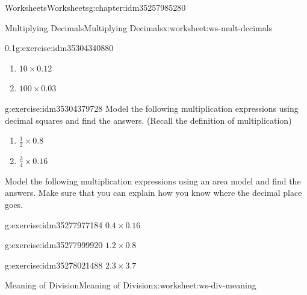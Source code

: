 \documentclass[twoside,11pt,]{book}
\begin{document}
\begin{chapterptx}{Worksheets}{}{Worksheets}{}{}{g:chapter:idm35257985280}
\begin{worksheet-section-numberless}{Multiplying Decimals}{}{Multiplying Decimals}{}{}{x:worksheet:ws-mult-decimals}
\begin{divisionexercise}{3}{}{0.1}{g:exercise:idm35304340880}
\begin{enumerate}[label=(\alph*)]
\item{}\(10 \times 0.12 \)%
\item{}\(100 \times 0.03 \)%
\end{enumerate}
\end{divisionexercise}%
\begin{divisionexercise}{4}{}{}{g:exercise:idm35304379728}%
Model the following multiplication expressions using decimal squares and find the answers. (Recall the definition of multiplication)%
%
\begin{enumerate}[label=(\alph*)]
\item{}\(\frac{1}{2} \times 0.8 \)%
\item{}\(\frac{3}{4} \times 0.16 \)%
\end{enumerate}
\end{divisionexercise}%
\clearpage
\begin{introduction}{}%
Model the following multiplication expressions using an area model and find the answers.  Make sure that you can explain how you know where the decimal place goes.%
\end{introduction}%
\begin{divisionexercise}{5}{}{}{g:exercise:idm35277977184}%
\(0.4 \times 0.16\)%
\end{divisionexercise}%
\begin{divisionexercise}{6}{}{}{g:exercise:idm35277999920}%
\(1.2 \times 0.8\)%
\end{divisionexercise}%
\begin{divisionexercise}{7}{}{}{g:exercise:idm35278021488}%
\(2.3 \times 3.7 \)%
\end{divisionexercise}%
\end{worksheet-section-numberless}
\restoregeometry
%
%
\typeout{************************************************}
\typeout{************************************************}
%
\begin{worksheet-section-numberless}{Meaning of Division}{}{Meaning of Division}{}{}{x:worksheet:ws-div-meaning}
\begin{introduction}{}%
\begin{sidebyside}{1}{0}{0}{0}%
\begin{sbspanel}{1}%

\end{sbspanel}
\end{sidebyside}
\end{introduction}
\end{worksheet-section-numberless}
\end{chapterptx}
\end{document}
